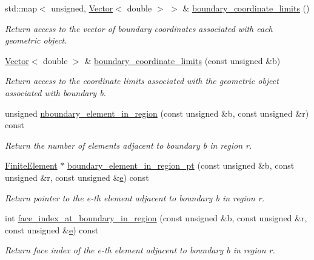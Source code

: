 \begin{DoxyCompactItemize}
std\+::map$<$ unsigned, \hyperlink{classoomph_1_1Vector}{Vector}$<$ double $>$ $>$ \& \hyperlink{classoomph_1_1UnstructuredTwoDMeshGeometryBase_a020d5b78ac82fbc04e131f8ba3eea638}{boundary\+\_\+coordinate\+\_\+limits} ()
\begin{DoxyCompactList}\small\item\em Return access to the vector of boundary coordinates associated with each geometric object. \end{DoxyCompactList}\item 
\hyperlink{classoomph_1_1Vector}{Vector}$<$ double $>$ \& \hyperlink{classoomph_1_1UnstructuredTwoDMeshGeometryBase_ac43fe4d9229d910fbce52db70f7b815c}{boundary\+\_\+coordinate\+\_\+limits} (const unsigned \&b)
\begin{DoxyCompactList}\small\item\em Return access to the coordinate limits associated with the geometric object associated with boundary b. \end{DoxyCompactList}\item 
unsigned \hyperlink{classoomph_1_1UnstructuredTwoDMeshGeometryBase_a93eb7cb31573833c66dc0eaa4ae357ef}{nboundary\+\_\+element\+\_\+in\+\_\+region} (const unsigned \&b, const unsigned \&r) const
\begin{DoxyCompactList}\small\item\em Return the number of elements adjacent to boundary b in region r. \end{DoxyCompactList}\item 
\hyperlink{classoomph_1_1FiniteElement}{Finite\+Element} $\ast$ \hyperlink{classoomph_1_1UnstructuredTwoDMeshGeometryBase_a68c814fe9fb770509bfaec8f4ad1b932}{boundary\+\_\+element\+\_\+in\+\_\+region\+\_\+pt} (const unsigned \&b, const unsigned \&r, const unsigned \&\hyperlink{cfortran_8h_a37cd013acc76697829c324bdd8562d82}{e}) const
\begin{DoxyCompactList}\small\item\em Return pointer to the e-\/th element adjacent to boundary b in region r. \end{DoxyCompactList}\item 
int \hyperlink{classoomph_1_1UnstructuredTwoDMeshGeometryBase_a79e290f51b212b71d021cd1bd60abd3b}{face\+\_\+index\+\_\+at\+\_\+boundary\+\_\+in\+\_\+region} (const unsigned \&b, const unsigned \&r, const unsigned \&\hyperlink{cfortran_8h_a37cd013acc76697829c324bdd8562d82}{e}) const
\begin{DoxyCompactList}\small\item\em Return face index of the e-\/th element adjacent to boundary b in region r. \end{DoxyCompactList}\item 

\end{DoxyCompactItemize}
